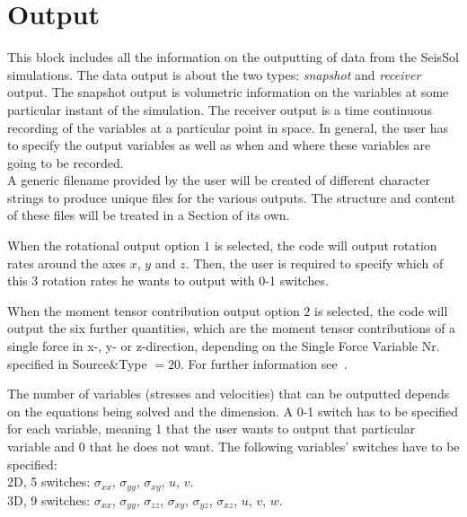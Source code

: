 \documentclass[12pt,twoside]{article}
\begin{document}
\newpage

\section{Output}
\label{sec-block-out}

This block includes all the information on the outputting of data from the SeisSol simulations.
The data output is about the two types: \textit{snapshot} and \textit{receiver} output.
The snapshot output is volumetric information on the variables at some particular instant of the simulation.
The receiver output is a time continuous recording of the variables at a particular point in space.
In general, the user has to specify the output variables as well as when and where these variables are going to be recorded.\\

\noindent
A generic filename provided by the user will be created of different character strings to produce unique files for the various outputs.
The structure and content of these files will be treated in a Section of its own.

\noindent
When the rotational output option $1$ is selected, the code will output rotation rates around the axes $x$, $y$ and $z$.
Then, the user is required to specify which of this 3 rotation rates he wants to output with 0-1 switches.

\noindent
When the moment tensor contribution output option $2$ is selected, the code will output the six further quantities, which are
the moment tensor contributions of a single force in x-, y- or z-direction, depending on the Single Force Variable Nr. specified
in Source\&Type $= 20$. For further information see~\cite{GravesWald01}.

\noindent
The number of variables (stresses and velocities) that can be outputted depends on the equations being solved and the dimension.
A 0-1 switch has to be specified for each variable, meaning 1 that the user wants to output that particular variable
and 0 that he does not want. The following variables' switches have to be specified:\\
2D, 5 switches: $\sigma_{xx}$, $\sigma_{yy}$, $\sigma_{xy}$, $u$, $v$.\\
3D, 9 switches: $\sigma_{xx}$, $\sigma_{yy}$, $\sigma_{zz}$, $\sigma_{xy}$, $\sigma_{yz}$, $\sigma_{xz}$, $u$, $v$, $w$.\\
\end{document}

